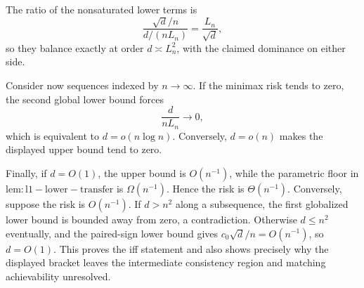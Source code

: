 The ratio of the nonsaturated lower terms is
\[
 \frac{\sqrt d/n}{d/(nL_n)}=\frac{L_n}{\sqrt d},
\]
so they balance exactly at order \(d\asymp L_n^2\), with the claimed dominance on either side.

Consider now sequences indexed by \(n\to\infty\).  If the minimax risk tends to zero, the second global lower bound forces
\[
 \frac d{nL_n}\longrightarrow0,
\]
which is equivalent to \(d=o(n\log n)\).  Conversely, \(d=o(n)\) makes the displayed upper bound tend to zero.

Finally, if \(d=O(1)\), the upper bound is \(O(n^{-1})\), while the parametric floor in \(\mathrm{lem:l1-lower-transfer}\) is \(\Omega(n^{-1})\).  Hence the risk is \(\Theta(n^{-1})\).  Conversely, suppose the risk is \(O(n^{-1})\).  If \(d>n^2\) along a subsequence, the first globalized lower bound is bounded away from zero, a contradiction.  Otherwise \(d\le n^2\) eventually, and the paired-sign lower bound gives \(c_0\sqrt d/n=O(n^{-1})\), so \(d=O(1)\).  This proves the iff statement and also shows precisely why the displayed bracket leaves the intermediate consistency region and matching achievability unresolved.